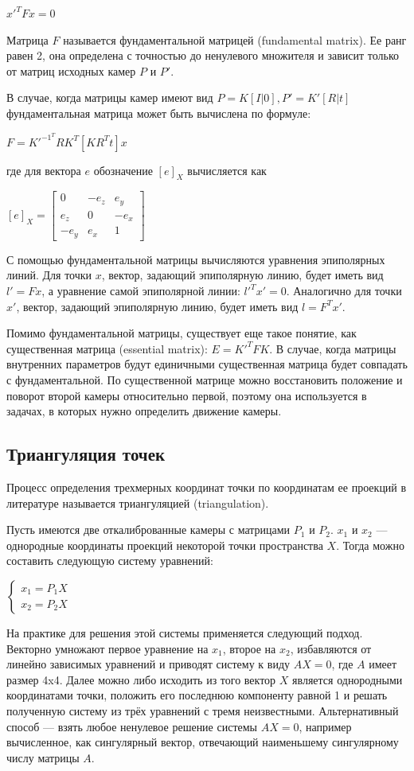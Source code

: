 $x'^T F x = 0$

Матрица $F$ называется фундаментальной матрицей (fundamental matrix). Ее ранг равен 2, она определена с точностью до ненулевого множителя и зависит только от матриц исходных камер $P$ и $P'$.

В случае, когда матрицы камер имеют вид $P = K[I|0], P' = K'[R|t]$ фундаментальная матрица может быть вычислена по формуле: 

$F = K'^{-1^T}RK^T[KR^Tt]x$

где для вектора $e$ обозначение $[e]_X$ вычисляется как 

$[e]_X = \begin{bmatrix}
	0 & -e_z & e_y\\
	e_z & 0 & -e_x\\
	-e_y & e_x & 1
\end{bmatrix}$

С помощью фундаментальной матрицы вычисляются уравнения эпиполярных линий. Для точки $x$, вектор, задающий эпиполярную линию, будет иметь вид $l' = F x$, а уравнение самой эпиполярной линии: $l'^T x' = 0$. Аналогично для точки $x'$, вектор, задающий эпиполярную линию, будет иметь вид $l = F^T x'$.

Помимо фундаментальной матрицы, существует еще такое понятие, как существенная матрица (essential matrix): $E = K'^T F K$. В случае, когда матрицы внутренних параметров будут единичными существенная матрица будет совпадать с фундаментальной. По существенной матрице можно восстановить положение и поворот второй камеры относительно первой, поэтому она используется в задачах, в которых нужно определить движение камеры.

\subsection{Триангуляция точек}
Процесс определения трехмерных координат точки по координатам ее проекций в литературе называется триангуляцией (triangulation).

Пусть имеются две откалиброванные камеры с матрицами $P_1$ и $P_2$. $x_1$ и $x_2$ — однородные координаты проекций некоторой точки пространства $X$. Тогда можно составить следующую систему уравнений:

$\begin{cases}
	x_1 = P_1X \\
	x_2 = P_2X
\end{cases}$

На практике для решения этой системы применяется следующий подход. Векторно умножают первое уравнение на $x_1$, второе на $x_2$, избавляются от линейно зависимых уравнений и приводят систему к виду $A X = 0$, где $A$ имеет размер 4x4. Далее можно либо исходить из того вектор $X$ является однородными координатами точки, положить его последнюю компоненту равной 1 и решать полученную систему из трёх уравнений с тремя неизвестными. Альтернативный способ — взять любое ненулевое решение системы $A X = 0$, например вычисленное, как сингулярный вектор, отвечающий наименьшему сингулярному числу матрицы $A$.

